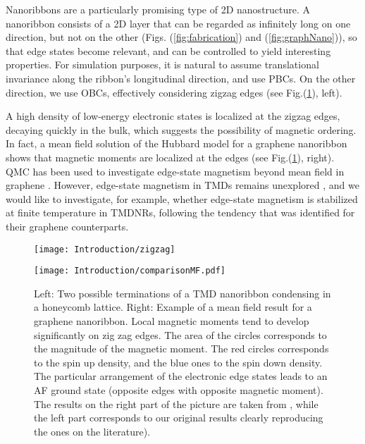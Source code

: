 Nanoribbons are a particularly promising type of \acs{2D} nanostructure.
A nanoribbon consists of a \ac{2D} layer that can be regarded as infinitely long on one direction, but not on the other (Figs. (\ref{fig:fabrication}) and (\ref{fig:graphNano})), so that edge states become relevant, and can be controlled to yield interesting properties.
For simulation purposes, it is natural to assume translational invariance along the ribbon's longitudinal direction, and use \acp{PBC}.
On the other direction, we use \acp{OBC}, effectively considering zigzag edges (see Fig.(\ref{fig:nanoribbons}), left).
   
A high density of low-energy electronic states is localized at the zigzag edges, decaying quickly in the bulk, which suggests the possibility of magnetic ordering.
In fact, a mean field solution of the Hubbard model for a graphene nanoribbon shows that magnetic moments are localized at the edges \cite{yazyev_emergence_2010} (see Fig.(\ref{fig:nanoribbons}), right).
QMC has been used to investigate edge-state magnetism beyond mean field in graphene \cite{feldner_dynamical_2011, golor_quantum_2013, cheng_strain-induced_2015, raczkowski_interplay_2017, yang_strain-tuning_2017}.
However, edge-state magnetism in \acp{TMD} remains unexplored \cite{davelou_nanoribbon_2017}, and we would like to investigate, for example, whether edge-state magnetism is stabilized at finite temperature in \acp{TMDNR}, following the tendency that was identified for their graphene counterparts.

\begin{figure}[H]
\vspace{-0.5cm}
\hspace{0.5cm}
\begin{minipage}[c]{0.1\textwidth}
\texttt{[image: Introduction/zigzag]}
\end{minipage} \hspace{4.2cm}
\begin{minipage}[c]{0.1\textwidth}
\vspace{0.3cm}
\texttt{[image: Introduction/comparisonMF.pdf]}
\end{minipage}
\vspace{-0.5cm}
 \caption[Zigzag edges of a nanoribbon and magnetism.]{Left: Two possible terminations of a \ac{TMD} nanoribbon condensing in a honeycomb lattice.
Right: Example of a mean field result for a  graphene nanoribbon.
Local magnetic moments tend to develop significantly on zig zag edges.
The area of the circles corresponds to the magnitude of the magnetic moment.
The red circles corresponds to the spin up density, and the blue ones to the spin down density.
The particular arrangement of the electronic edge states leads to an \ac{AF} ground state (opposite edges with opposite magnetic moment). The results on the right part of the picture are taken from \cite{yazyev_emergence_2010}, while the left part corresponds to our original results clearly reproducing the ones on the literature). \label{fig:nanoribbons}}
\end{figure}

